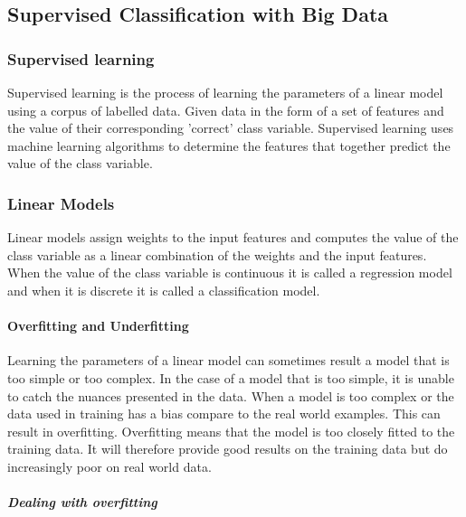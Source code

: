 \subsection{Supervised Classification with Big Data}

\subsubsection{Supervised learning}
Supervised learning is the process of learning the parameters of a linear model using a corpus of labelled data.
Given data in the form of a set of features and the value of their corresponding 'correct' class variable.  
Supervised learning uses machine learning algorithms to determine the features that together predict the value of the class variable.  

\subsubsection{Linear Models}

Linear models assign weights to the input features and computes the value of the class variable as a linear combination of the weights and the input features.
When the value of the class variable is continuous it is called a regression model and when it is discrete it is called a classification model.


\paragraph{Overfitting and Underfitting}
Learning the parameters of a linear model can sometimes result a model that is too simple or too complex.
In the case of a model that is too simple, it is unable to catch the nuances presented in the data.
When a model is too complex or the data used in training has a bias compare to the real world examples.
This can result in overfitting.
Overfitting means that the model is too closely fitted to the training data.
It will therefore provide good results on the training data but do increasingly poor on real world data.

\subparagraph{Dealing with overfitting}

